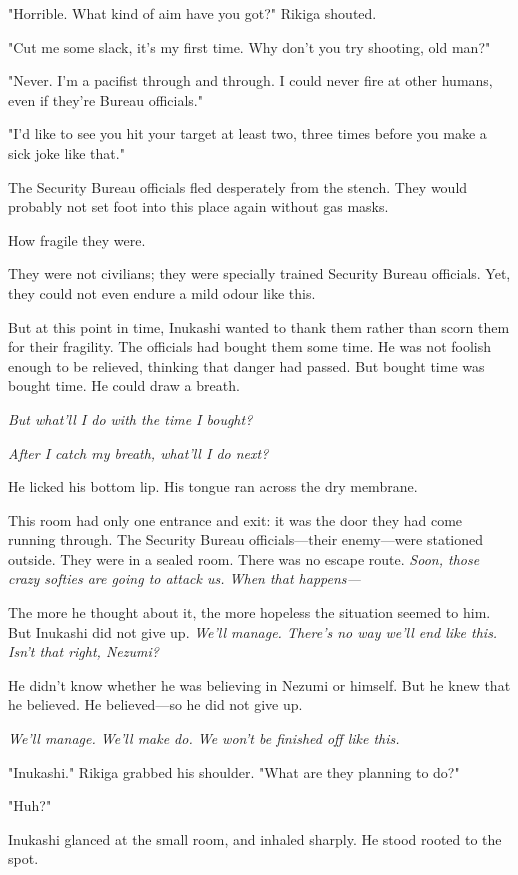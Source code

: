 "Horrible. What kind of aim have you got?" Rikiga shouted.

"Cut me some slack, it's my first time. Why don't you try shooting, old
man?"

"Never. I'm a pacifist through and through. I could never fire at other
humans, even if they're Bureau officials."

"I'd like to see you hit your target at least two, three times before
you make a sick joke like that."

The Security Bureau officials fled desperately from the stench. They
would probably not set foot into this place again without gas masks.

How fragile they were.

They were not civilians; they were specially trained Security Bureau
officials. Yet, they could not even endure a mild odour like this.

But at this point in time, Inukashi wanted to thank them rather than
scorn them for their fragility. The officials had bought them some time.
He was not foolish enough to be relieved, thinking that danger had
passed. But bought time was bought time. He could draw a breath.

\emph{But what'll I do with the time I bought?}

\emph{After I catch my breath, what'll I do next?}

He licked his bottom lip. His tongue ran across the dry membrane.

This room had only one entrance and exit: it was the door they had come
running through. The Security Bureau officials---their enemy---were
stationed outside. They were in a sealed room. There was no escape
route. \emph{Soon, those crazy softies are going to attack us. When that
happens---}

The more he thought about it, the more hopeless the situation seemed to
him. But Inukashi did not give up. \emph{We'll manage. There's no way we'll
end like this. Isn't that right, Nezumi?}

He didn't know whether he was believing in Nezumi or himself. But he
knew that he believed. He believed---so he did not give up.

\emph{We'll manage. We'll make do. We won't be finished off like this.}

"Inukashi." Rikiga grabbed his shoulder. "What are they planning to do?"

"Huh?"

Inukashi glanced at the small room, and inhaled sharply. He stood rooted
to the spot.

